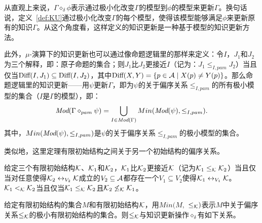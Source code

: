 从直观上来说，$\Gamma \diamond_{\delta} \phi$表示通过极小化改变$\Gamma$的模型到$\phi$的模型来更新$\Gamma$。换句话说，定义~\ref{def:KU}通过极小化改变$\Gamma$的每个模型，使得该模型能够满足$\phi$来更新原有的知识$\Gamma$。从这个角度看，这样定义的知识更新是一种基于模型的知识更新方法。

此外，$\mu$-演算下的知识更新也可以通过像命题逻辑里的那样来定义：令$I$，$J_1$和$J_2$为三个解释，即：原子命题的集合；则$J_1$比$J_2$更接近$I$（记为：$J_1 \leq_{I,pam} J_2$）当且仅当$\textrm{Diff}(I, J_1) \subseteq \textrm{Diff}(I, J_2)$，其中$\textrm{Diff}(X, Y) =\{p\in {\cal A} \mid X(p) \not = Y(p)\}$。那么命题逻辑里的知识更新——用$\psi$更新$\Gamma$，即为$\psi$的关于偏序关系$\leq_{I,pam}$的所有极小模型的集合（$I$是$\Gamma$的模型），即：
$$\textit{Mod}(\Gamma \diamond_{pam} \psi) = \bigcup_{I \in \textit{Mod}(\Gamma)} Min(\textit{Mod}(\psi), \leq_{I,pam}).$$
其中，$Min(\textit{Mod}(\psi), \leq_{I,pam})$是$\psi$的关于偏序关系$\leq_{I,pam}$的极小模型的集合。

类似地，这里定理有限初始结构之间关于另一个初始结构的偏序关系。
\begin{definition}\label{def:closer}
	给定三个有限初始结构${\cal K}$、${\cal K}_1$和${\cal K}_2$，${\cal K}_1$比${\cal K}_2$更接近${\cal K}$（记为${\cal K}_1 \leq_{{\cal K}} {\cal K}_2$）当且仅当对任意使得${\cal K}_2 \leftrightarrow_{V_2} {\cal K}$成立的$V_2 \subseteq \mathcal{A}$都存在一个$V_1 \subseteq V_2$使得${\cal K}_1 \leftrightarrow_{V_1} {\cal K}$。
	 ${\cal K}_1 <_{{\cal K}} {\cal K}_2$当且仅当${\cal K}_1 \leq_{{\cal K}} {\cal K}_2$且${\cal K}_2 \not \leq_{{\cal K}} {\cal K}_1$。
\end{definition}

给定有限初始结构的集合$M$和有限初始结构${\cal K}$，用$Min(M,$ $\leq_{{\cal K}})$表示$M$中关于偏序关系$\leq_{{\cal K}}$的极小有限初始结构的集合。则$\leq_{{\cal K}}$与知识更新操作$\diamond_{\delta}$有如下关系。

